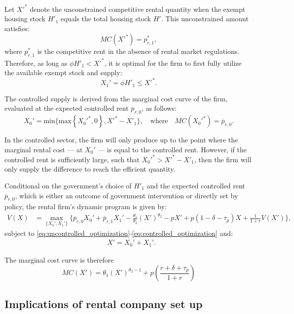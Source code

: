 \documentclass[parskip=full]{article}
\begin{document}
Let $X'^{*}$ denote the unconstrained competitive rental quantity when the exempt housing stock $H'_1$ equals the total housing stock $H'$. This unconstrained amount satisfies: \[MC(X'^{*}) = p^{*}_{r,1},\] where $p^{*}_{r,1}$ is the competitive rent in the absence of rental market regulations. Therefore, as long as $\phi H'_1<X'^{*}$, it is optimal for the firm to first fully utilize the available exempt stock and supply:
\begin{equation}\label{eq:uncontrolled_optimization}
X_1'=\phi H'_1\leq X'^{*}.  
\end{equation}

The controlled supply is derived from the marginal cost curve of the firm, evaluated at the expected controlled rent $\overline{p}_{r,0}$, as follows: 
\begin{equation}\label{eq:controlled_optimization}
X_0'=\mbox{min}\{\text{max}\left\{X_0'^*,0\right\},X'^*-X'_1\}, \quad
\text{where}\quad MC(X_0'^*)=\overline{p}_{r,0}.    
\end{equation}

\noindent In the controlled sector, the firm will only produce up to the point where the marginal rental cost — at $X_0'$ — is equal to the controlled rent. However, if the controlled rent is sufficiently large, such that $X_0'^*>X'^*-X'_1$, then the firm will only supply the difference to reach the efficient quantity.

Conditional on the government’s choice of $H'_1$ and the expected controlled rent $\overline{p}_{r,0}$, which is either an outcome of government intervention or directly set by policy, the rental firm’s dynamic program is given by:
\begin{align}\label{eq:rental_optimization}
V(X) &= \max_{\{X_0',X_1'\}} \Big\{\overline{p}_{r,0}X_0'+\overline{p}_{r,1} X_1'-\frac{\theta_1}{\theta_2}(X')^{\theta_2}-p X'+p(1-\delta-\tau_p)X+\frac{1}{1+r} V(X')\Big\},
\end{align}
\noindent subject to \eqref{eq:uncontrolled_optimization}-\eqref{eq:controlled_optimization} and:
\begin{align}
& X'=X_0'+X_1'. \label{eq:total_supply_def}
\end{align}

\noindent The marginal cost curve is therefore \[MC(X')=\theta_1(X')^{\theta_2-1}+p\left(\frac{r+\delta+\tau_p}{1+r}\right)\]

\subsection{Implications of rental company set up}
\end{document}
